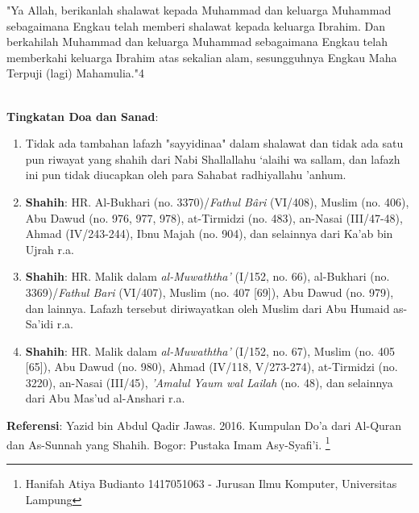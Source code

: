 \documentclass[a4paper,12pt]{article}
\begin{document}
\par
\indent
"Ya Allah, berikanlah shalawat kepada Muhammad dan keluarga Muhammad 
sebagaimana Engkau telah memberi shalawat kepada keluarga Ibrahim. Dan 
berkahilah Muhammad dan keluarga Muhammad sebagaimana Engkau telah 
memberkahi keluarga Ibrahim atas sekalian alam, sesungguhnya Engkau Maha 
Terpuji (lagi) Mahamulia."{\scriptsize 4}\\\\
\par
\noindent
\textbf{Tingkatan Doa dan Sanad}:
\begin{enumerate}
\item Tidak ada tambahan lafazh "sayyidinaa" dalam shalawat dan tidak ada 
satu pun riwayat yang shahih dari Nabi Shallallahu ‘alaihi wa sallam, dan 
lafazh ini pun tidak diucapkan oleh para Sahabat radhiyallahu 'anhum.
\item \textbf{Shahih}: HR. Al-Bukhari (no. 3370)/\textit{Fathul B\^{a}ri} 
(VI/408), Muslim (no. 406), Abu Dawud (no. 976, 977, 978), at-Tirmidzi (no. 
483), an-Nasai (III/47-48), Ahmad (IV/243-244), Ibnu Majah (no. 904), dan 
selainnya dari Ka'ab bin Ujrah r.a.
\item \textbf{Shahih}: HR. Malik dalam \textit{al-Muwaththa'} (I/152, no. 
66), al-Bukhari (no. 3369)/\textit{Fathul Bari} (VI/407), Muslim (no. 407 
[69]), Abu Dawud (no. 979), dan lainnya. Lafazh tersebut diriwayatkan oleh 
Muslim dari Abu Humaid as-Sa'idi r.a.
\item \textbf{Shahih}: HR. Malik dalam \textit{al-Muwaththa'} (I/152, no. 
67), Muslim (no. 405 [65]), Abu Dawud (no. 980), Ahmad (IV/118, V/273-274), 
at-Tirmidzi (no. 3220), an-Nasai (III/45), \textit{'Amalul Yaum wal Lailah} 
(no. 48), dan selainnya dari Abu Mas'ud al-Anshari r.a.
\end{enumerate}
\textbf{Referensi}: Yazid bin Abdul Qadir Jawas. 2016. Kumpulan Do'a dari
Al-Quran dan As-Sunnah yang Shahih. Bogor: Pustaka Imam Asy-Syafi'i.
\footnote{Hanifah Atiya Budianto 1417051063 - Jurusan Ilmu Komputer,
Universitas Lampung}
\end{document}
